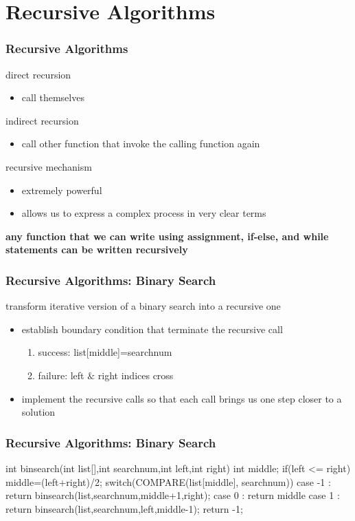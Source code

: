\documentclass[newPxFont,sthlmFooter,nooffset]{beamer}
\begin{document}
\section{Recursive Algorithms}
\begin{frame}[t]
  \frametitle{Recursive Algorithms}
direct recursion
\begin{itemize}
\item call themselves
\end{itemize}

indirect recursion
\begin{itemize}
\item call other function that invoke the calling function again
\end{itemize}

recursive mechanism
\begin{itemize}
\item extremely powerful
\item allows us to express a complex process in very clear terms
\end{itemize}

\textbf{any function that we can write using assignment, if-else, and while statements can be written recursively}
\end{frame}

\begin{frame}[t]
  \frametitle{Recursive Algorithms: Binary Search}
transform iterative version of a binary search into a recursive one
\begin{itemize}
\item establish boundary condition that terminate the recursive call
  \begin{enumerate}
  \item success: list[middle]=searchnum
  \item failure: left $\&$ right indices cross
  \end{enumerate}
\item implement the recursive calls so that each call brings us one
  step closer to a solution
\end{itemize}
\end{frame}

\begin{frame}[t, fragile]
  \frametitle{Recursive Algorithms: Binary Search}
\begin{codedef}
int binsearch(int list[],int searchnum,int left,int right) {
   int middle;
   if(left <= right) {
      middle=(left+right)/2; 
      switch(COMPARE(list[middle], searchnum)) { 
         case -1 : return
            binsearch(list,searchnum,middle+1,right); 
         case 0 : return middle
         case 1 : return
            binsearch(list,searchnum,left,middle-1); 
      }
   }
   return -1; 
}    
\end{codedef}
\end{frame}
\end{document}
